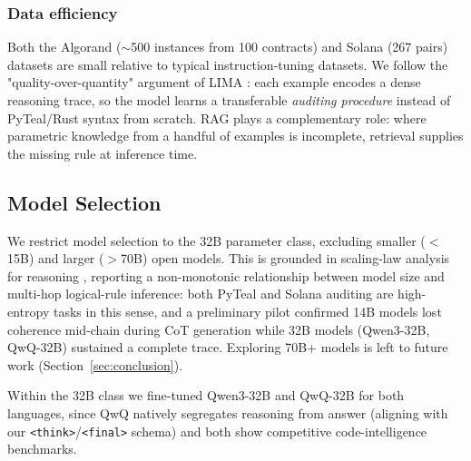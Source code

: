 \documentclass[lettersize,journal]{IEEEtran}
\begin{document}
\subsubsection{Data efficiency}
\label{sec:dataset_limitations}
Both the Algorand ($\sim$500 instances from 100 contracts) and Solana (267 pairs) datasets are small relative to typical instruction-tuning datasets.
We follow the "quality-over-quantity" argument of LIMA \cite{zhou2023lima}: each example encodes a 
dense reasoning
trace, so the model learns a transferable \emph{auditing procedure} instead of PyTeal/Rust syntax
from scratch. RAG plays a complementary role: where parametric knowledge from a handful of examples
is incomplete, retrieval supplies the missing rule at inference time. 

\subsection{Model Selection}
\label{sec:model_selection}

We restrict model selection to the 32B parameter class, excluding smaller ($<$15B) and larger
($>$70B) open models. This is grounded in scaling-law analysis for reasoning \cite{wang2025larger},
reporting a non-monotonic relationship between model size and multi-hop logical-rule inference: both
PyTeal and Solana auditing are high-entropy tasks in this sense, and a preliminary pilot confirmed
14B models lost coherence mid-chain during CoT generation while 32B models (Qwen3-32B, QwQ-32B)
sustained a complete trace. Exploring 70B+ models is left to future work
(Section~\ref{sec:conclusion}).

Within the 32B class we fine-tuned Qwen3-32B \cite{qwen3_2025} and QwQ-32B \cite{qwq32b_2025} for
both languages, since QwQ natively segregates reasoning from answer (aligning with our
\texttt{<think>}/\texttt{<final>} schema) and both show competitive code-intelligence benchmarks.
\end{document}
